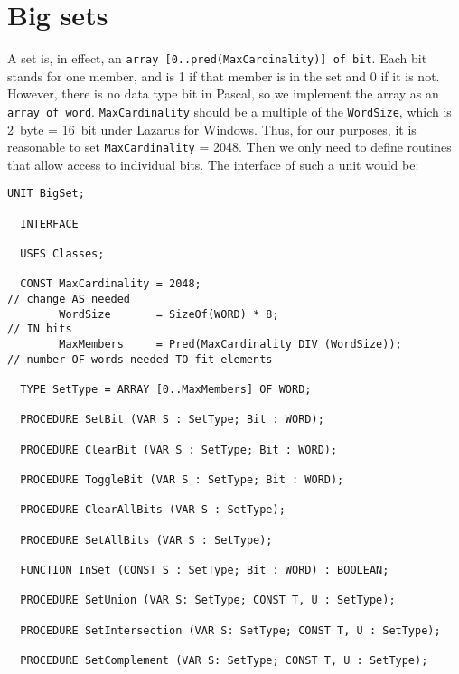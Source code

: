 \chapter{Big sets}
\begin{refsection}


A set is, in effect, an \texttt{array [0..pred(MaxCardinality)] of bit}. Each bit stands for one member, and is 1 if that member is in the set and 0 if it is not. However, there is no data type bit in Pascal, so we implement the array as an \texttt{array of word}. \texttt{MaxCardinality} should be a multiple of the \texttt{WordSize}, which is \SI{2}{byte} = \SI{16}{bit} under Lazarus for Windows. Thus, for our purposes, it is reasonable to set \texttt{MaxCardinality} = \num{2048}. Then we only need to define routines that allow access to individual bits. The interface of such a unit would be:
\begin{lstlisting}[caption=Interface]
  UNIT BigSet;

  INTERFACE

  USES Classes;

  CONST MaxCardinality = 2048;                                       // change AS needed
        WordSize       = SizeOf(WORD) * 8;                           // IN bits
        MaxMembers     = Pred(MaxCardinality DIV (WordSize));        // number OF words needed TO fit elements

  TYPE SetType = ARRAY [0..MaxMembers] OF WORD;

  PROCEDURE SetBit (VAR S : SetType; Bit : WORD);

  PROCEDURE ClearBit (VAR S : SetType; Bit : WORD);

  PROCEDURE ToggleBit (VAR S : SetType; Bit : WORD);

  PROCEDURE ClearAllBits (VAR S : SetType);

  PROCEDURE SetAllBits (VAR S : SetType);

  FUNCTION InSet (CONST S : SetType; Bit : WORD) : BOOLEAN;

  PROCEDURE SetUnion (VAR S: SetType; CONST T, U : SetType);

  PROCEDURE SetIntersection (VAR S: SetType; CONST T, U : SetType);

  PROCEDURE SetComplement (VAR S: SetType; CONST T, U : SetType);


\end{lstlisting}
\end{refsection}
